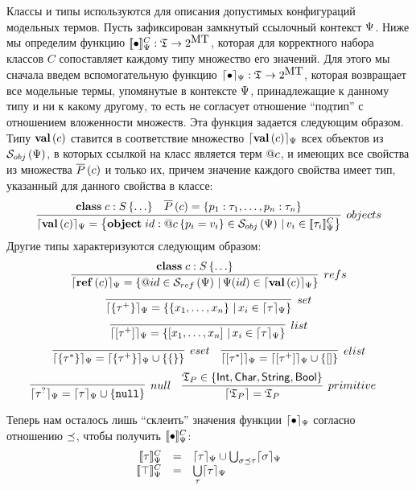 Классы и типы используются для описания допустимых конфигураций модельных термов. 
Пусть зафиксирован замкнутый ссылочный контекст $\Psi$. 
Ниже мы определим функцию $[\![\bullet]\!]_\Psi^C : \mathfrak{T} \rightarrow 2^{\mbox{MT}}$, которая для корректного набора классов $C$ сопоставляет каждому типу множество его значений. Для этого мы сначала введем вспомогательную функцию $\lceil \bullet \rceil_\Psi : \mathfrak{T} \rightarrow 2^{\mbox{MT}}$, которая возвращает все модельные термы, упомянутые в контексте $\Psi$, принадлежащие к данному типу и ни к какому другому, то есть не согласует отношение ``подтип'' с отношением вложенности множеств. Эта функция задается следующим образом. Типу $\mathbf{val}\left(c\right)$ ставится в соответствие множество $\lceil \mathbf{val}\left(c\right) \rceil_\Psi$ всех объектов из $\mathcal{S}_{obj}\left(\Psi\right)$, в которых ссылкой на класс является терм $@c$, и имеющих все свойства из множества $\overline{P}\left(c\right)$ и только их, причем значение каждого свойства имеет тип, указанный для данного свойства в классе:
$$
\infer[objects]{
	\semRC{\ClassT{c}} = \left\{
		\Object{id}{\Ref{c}}{p_i = v_i} \in \Objects{\RContext}
		\,|\,
		v_i \in \denotRCC{\tau_i} 
	\right\}
}{
	\Class{c}{S}{\ldots}&
	\AllProps{c} = \left\{p_1 : \tau_1, \ldots, p_n : \tau_n\right\}
}
$$ 
Другие типы характеризуются следующим образом:
$$
\infer[refs]{
	\semRC{\RefT{c}} = \left\{ \Ref{id} \in \Refs{\RContext} \,|\, \RContext(id) \in \semRC{\ClassT{c}} \right\}
}{
	\Class{c}{S}{\ldots}
}
$$ $$
\infer[set]{
	\semRC{\SetT{\tau^+}} = \left\{ \Set{x_1,\ldots,x_n} \,|\, x_i \in \semRC{\tau}\right\}
}{
}
$$ $$
\infer[list]{
	\semRC{\ListT{\tau^+}} = \left\{ \List{x_1,\ldots,x_n} \,|\, x_i \in \semRC{\tau}\right\}
}{
}
$$ $$
\infer[eset]{
	\semRC{\SetT{\tau^*}} = \semRC{\SetT{\tau^+}} \cup \left\{ \Set{} \right\}
}{}	
\quad
\infer[elist]{
	\semRC{\ListT{\tau^*}} = \semRC{\ListT{\tau^+}} \cup \left\{ \List{} \right\}
}{}	
$$ $$
\infer[null]{
	\semRC{\NullableT{\tau}} = \semRC{\tau} \cup \{\Null\}
}{
}
\quad
\infer[primitive]{
	\sem{\Types_P} = \Types_P
}{
	\Types_P \in \{\IntegerT, \CharT, \StringT, \BooleanT\}
}
\quad
$$

Теперь нам осталось лишь ``склеить'' значения функции $\lceil \bullet \rceil_\Psi$ согласно отношению $\preceq$, чтобы получить $[\![\bullet]\!]_\Psi^C$:
$$
\begin{array}{rcl}
	\denotRCC{\tau} &=& \semRC{\tau} \cup \bigcup_{\sigma \subtype \tau} \semRC{\sigma}\\
	\denotRCC{\top} &=& \bigcup\limits_\tau \semRC{\tau}\\
\end{array}	
$$

